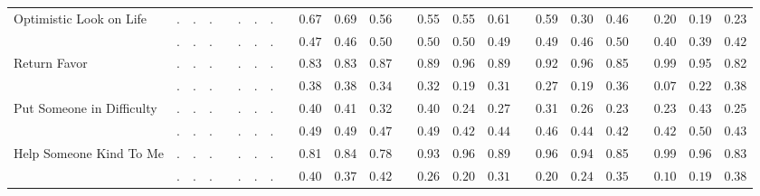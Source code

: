 \begin{center}
{\begin{longtable}{L{12em} c c c p{1.2em} c c c p{1.2em} c c c p{1.2em} c c c p{1.2em} c c c p{1.2em} c c c}
Optimistic Look on Life & . &         . &         . & &         . &         . &         . & &      0.67 &      0.69 &      0.56 & &      0.55 &      0.55 &      0.61 & &      0.59 &      0.30 &      0.46 & &      0.20 &      0.19 &      0.23 \\*
& $\mathit{        .}$ & $\mathit{        .}$ & $\mathit{        .}$ & & $\mathit{        .}$ & $\mathit{        .}$ & $\mathit{        .}$ & & $\mathit{     0.47}$ & $\mathit{     0.46}$ & $\mathit{     0.50}$ & & $\mathit{     0.50}$ & $\mathit{     0.50}$ & $\mathit{     0.49}$ & & $\mathit{     0.49}$ & $\mathit{     0.46}$ & $\mathit{     0.50}$ & & $\mathit{     0.40}$ & $\mathit{     0.39}$ & $\mathit{     0.42}$ \\[.7em]
Return Favor & . &         . &         . & &         . &         . &         . & &      0.83 &      0.83 &      0.87 & &      0.89 &      0.96 &      0.89 & &      0.92 &      0.96 &      0.85 & &      0.99 &      0.95 &      0.82 \\*
& $\mathit{        .}$ & $\mathit{        .}$ & $\mathit{        .}$ & & $\mathit{        .}$ & $\mathit{        .}$ & $\mathit{        .}$ & & $\mathit{     0.38}$ & $\mathit{     0.38}$ & $\mathit{     0.34}$ & & $\mathit{     0.32}$ & $\mathit{     0.19}$ & $\mathit{     0.31}$ & & $\mathit{     0.27}$ & $\mathit{     0.19}$ & $\mathit{     0.36}$ & & $\mathit{     0.07}$ & $\mathit{     0.22}$ & $\mathit{     0.38}$ \\[.7em]
Put Someone in Difficulty & . &         . &         . & &         . &         . &         . & &      0.40 &      0.41 &      0.32 & &      0.40 &      0.24 &      0.27 & &      0.31 &      0.26 &      0.23 & &      0.23 &      0.43 &      0.25 \\*
& $\mathit{        .}$ & $\mathit{        .}$ & $\mathit{        .}$ & & $\mathit{        .}$ & $\mathit{        .}$ & $\mathit{        .}$ & & $\mathit{     0.49}$ & $\mathit{     0.49}$ & $\mathit{     0.47}$ & & $\mathit{     0.49}$ & $\mathit{     0.42}$ & $\mathit{     0.44}$ & & $\mathit{     0.46}$ & $\mathit{     0.44}$ & $\mathit{     0.42}$ & & $\mathit{     0.42}$ & $\mathit{     0.50}$ & $\mathit{     0.43}$ \\[.7em]
Help Someone Kind To Me & . &         . &         . & &         . &         . &         . & &      0.81 &      0.84 &      0.78 & &      0.93 &      0.96 &      0.89 & &      0.96 &      0.94 &      0.85 & &      0.99 &      0.96 &      0.83 \\*
& $\mathit{        .}$ & $\mathit{        .}$ & $\mathit{        .}$ & & $\mathit{        .}$ & $\mathit{        .}$ & $\mathit{        .}$ & & $\mathit{     0.40}$ & $\mathit{     0.37}$ & $\mathit{     0.42}$ & & $\mathit{     0.26}$ & $\mathit{     0.20}$ & $\mathit{     0.31}$ & & $\mathit{     0.20}$ & $\mathit{     0.24}$ & $\mathit{     0.35}$ & & $\mathit{     0.10}$ & $\mathit{     0.19}$ & $\mathit{     0.38}$ \\[.7em]

\end{longtable}}
\end{center}

